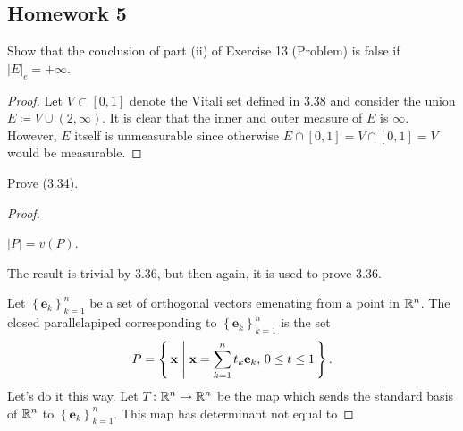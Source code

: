 \subsection{Homework 5}
\begin{problem}
Show that the conclusion of part  (ii) of Exercise 13 (Problem) is false if
$\left|E\right|_e=+\infty$.
\end{problem}
\begin{proof}
Let $V\subset[0,1]$ denote the Vitali set defined in 3.38 and consider the
union $E\coloneqq V\cup(2,\infty)$. It is clear that the inner and outer
measure of $E$ is $\infty$. However, $E$ itself is unmeasurable since
otherwise $E\cap[0,1]=V\cap[0,1]=V$ would be measurable.
\end{proof}
\newpage

\begin{problem}
Prove (3.34).
\end{problem}
\begin{proof}
\begin{lemma*}
$\left|P\right|=v(P)$.
\end{lemma*}
The result is trivial by 3.36, but then again, it is used to prove 3.36.

Let $\left\{\mathbf{e}_k\right\}_{k=1}^n$ be a set of orthogonal vectors
emenating from a point in $\mathbb{R}^n$. The closed parallelapiped corresponding
to $\left\{\mathbf{e}_k\right\}_{k=1}^n$ is the set
\begin{equation}
\label{eq:closed-parallelapiped}
P=
\left\{\,\mathbf{x}\;\middle|\;
\text{$\mathbf{x}=\sum_{k=1}^nt_k\mathbf{e}_k$, $0\leq t\leq 1$}\,\right\}.
\end{equation}
Let's do it this way. Let $T\colon\mathbb{R}^n\to\mathbb{R}^n$ be the map which sends
the standard basis of $\mathbb{R}^n$ to
$\left\{\mathbf{e}_k\right\}_{k=1}^n$. This map has determinant not equal
to
\end{proof}
\newpage

